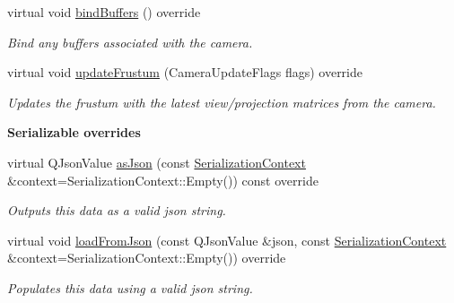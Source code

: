 \begin{Indent}
\begin{DoxyCompactItemize}
\mbox{\label{classrev_1_1_scene_camera_a37195b909b3b5454ea80bc12513ebfeb}} 
virtual void \mbox{\hyperlink{classrev_1_1_scene_camera_a37195b909b3b5454ea80bc12513ebfeb}{bind\+Buffers}} () override
\begin{DoxyCompactList}\small\item\em Bind any buffers associated with the camera. \end{DoxyCompactList}\item 
\mbox{\label{classrev_1_1_scene_camera_adcb6e6ae90643f073288b03ffffc69a3}} 
virtual void \mbox{\hyperlink{classrev_1_1_scene_camera_adcb6e6ae90643f073288b03ffffc69a3}{update\+Frustum}} (Camera\+Update\+Flags flags) override
\begin{DoxyCompactList}\small\item\em Updates the frustum with the latest view/projection matrices from the camera. \end{DoxyCompactList}\end{DoxyCompactItemize}
\end{Indent}
\begin{Indent}\textbf{ Serializable overrides}\par
\begin{DoxyCompactItemize}
\item 
\mbox{\label{classrev_1_1_scene_camera_a8b90c9be6ca0681b1aebd7dee779994b}} 
virtual Q\+Json\+Value \mbox{\hyperlink{classrev_1_1_scene_camera_a8b90c9be6ca0681b1aebd7dee779994b}{as\+Json}} (const \mbox{\hyperlink{structrev_1_1_serialization_context}{Serialization\+Context}} \&context=Serialization\+Context\+::\+Empty()) const override
\begin{DoxyCompactList}\small\item\em Outputs this data as a valid json string. \end{DoxyCompactList}\item 
\mbox{\label{classrev_1_1_scene_camera_a40fbb067991cc79da212e35a0f048fb7}} 
virtual void \mbox{\hyperlink{classrev_1_1_scene_camera_a40fbb067991cc79da212e35a0f048fb7}{load\+From\+Json}} (const Q\+Json\+Value \&json, const \mbox{\hyperlink{structrev_1_1_serialization_context}{Serialization\+Context}} \&context=Serialization\+Context\+::\+Empty()) override
\begin{DoxyCompactList}\small\item\em Populates this data using a valid json string. \end{DoxyCompactList}\end{DoxyCompactItemize}
\end{Indent}
